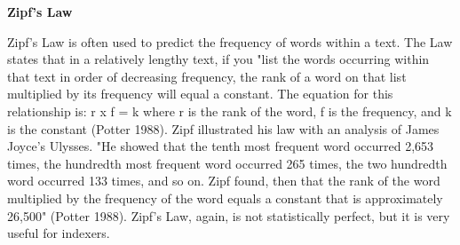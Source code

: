  \textbf{Zipf's Law}

  Zipf's Law is often used to predict the frequency of words within a
  text. The Law states that in a relatively lengthy text, if you "list
  the words occurring within that text in order of decreasing
  frequency, the rank of a word on that list multiplied by its
  frequency will equal a constant. The equation for this relationship
  is: r x f = k where r is the rank of the word, f is the frequency,
  and k is the constant (Potter 1988). Zipf illustrated his law with
  an analysis of James Joyce's Ulysses. "He showed that the tenth most
  frequent word occurred 2,653 times, the hundredth most frequent word
  occurred 265 times, the two hundredth word occurred 133 times, and
  so on. Zipf found, then that the rank of the word multiplied by the
  frequency of the word equals a constant that is approximately
  26,500" (Potter 1988). Zipf's Law, again, is not statistically
  perfect, but it is very useful for indexers.



